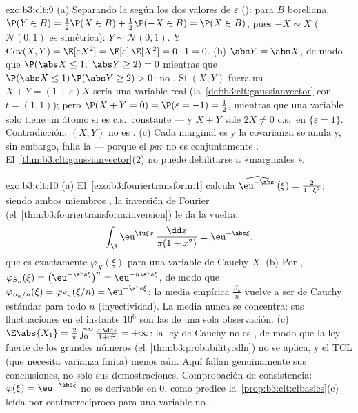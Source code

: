 \begin{solution}{exo:b3:clt:9}
(a) Separando la  según los
dos valores de $\varepsilon$
(): para $B$
boreliana, $\P(Y \in B) =
\frac12\P(X \in B) + \frac12\P(-X \in B) = \P(X \in B)$, pues
$-X \sim X$ ($\mathcal N(0,1)$ es simétrica): $Y \sim
\mathcal N(0,1)$. Y $\operatorname{Cov}(X, Y) =
\E[\varepsilon X^2] = \E[\varepsilon]\,\E[X^2] = 0 \cdot 1 =
0$. (b) $\abs Y = \abs X$, de modo que
$\P(\abs X \leq 1,\ \abs Y \geq 2)
= 0$ mientras que $\P(\abs X \leq 1)\,\P(\abs Y \geq 2) > 0$: no
. Si $(X, Y)$
fuera un , $X + Y =
(1 + \varepsilon)X$ sería una variable
 real
(la~\cref{def:b3:clt:gaussianvector} con $t = (1,1)$); pero
$\P(X + Y = 0) = \P(\varepsilon = -1) = \frac12$, mientras que una
variable  solo tiene un
átomo si es c.s.\ constante --- y $X + Y$ vale $2X \neq 0$ c.s.\ en
$\{\varepsilon = 1\}$. Contradicción: $(X, Y)$ no es
. (c) Cada marginal es
 y la covarianza se anula
y, sin embargo, falla la
 --- porque el
\emph{par} no es conjuntamente
.
El~\cref{thm:b3:clt:gaussianvector}(2) no puede debilitarse a
«marginales ».
\end{solution}

\begin{solution}{exo:b3:clt:10}
(a) El~\cref{exo:b3:fouriertransform:1} calcula
$\widehat{\eu^{-\abs\cdot}}(\xi) = \frac{2}{1 + \xi^2}$;
siendo ambos miembros , la
inversión de Fourier (el~\cref{thm:b3:fouriertransform:inversion}) le da
la vuelta:
\[
\int_\R\eu^{\iu\xi x}\,\frac{\dd x}{\pi(1 + x^2)} =
\eu^{-\abs\xi},
\]
que es exactamente $\varphi_X(\xi)$ para una variable de Cauchy $X$. (b)
Por ,
$\varphi_{S_n}(\xi) =
\bigl(\eu^{-\abs\xi}\bigr)^n = \eu^{-n\abs\xi}$, de modo que
$\varphi_{S_n/n}(\xi) = \varphi_{S_n}(\xi/n) =
\eu^{-\abs\xi}$: la media empírica $\frac{S_n}n$ vuelve a ser de Cauchy
estándar para todo $n$ (inyectividad). La media nunca se concentra: sus
fluctuaciones en el instante $10^6$ son las de una sola observación. (c)
$\E\abs{X_1} = \frac2\pi\int_0^\infty\frac{x\,\dd x}{1 +
x^2} = +\infty$: la ley de Cauchy no es
, de modo que la ley fuerte de
los grandes números (el~\cref{thm:b3:probability:slln}) no se aplica, y
el TCL (que necesita varianza finita) menos aún. Aquí fallan
genuinamente sus conclusiones, no solo sus demostraciones. Comprobación
de consistencia: $\varphi(\xi) = \eu^{-\abs\xi}$ no es derivable en $0$,
como predice la~\cref{prop:b3:clt:cfbasics}(c) leída por
contrarrecíproco para una variable no
.
\end{solution}

